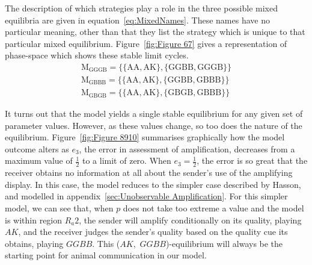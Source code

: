 \documentclass[a4paper,12pt]{article}
\numberwithin{equation}{section}
\begin{document}
The description of which strategies play a role in the three possible mixed equilibria are given in equation~\ref{eq:MixedNames}. These names have no particular meaning, other than that they list the strategy which is unique to that particular mixed equilibrium. Figure~\ref{fig:Figure 67} gives a representation of phase-space which shows these stable limit cycles.
\begin{subequations}
\label{eq:MixedNames}
\begin{gather}
\text{M}_{\text{GGGB}}= \{\{ \text{AA}, \text{AK}\}, \{\text{GGBB}, \text{GGGB}\}\}\\
\text{M}_{\text{GBBB}}= \{\{ \text{AA}, \text{AK}\}, \{\text{GGBB}, \text{GBBB}\}\}\\
\text{M}_{\text{GBGB}}= \{\{ \text{AA}, \text{AK}\}, \{\text{GBGB}, \text{GBBB}\}\}
\end{gather}
\end{subequations}

It turns out that the model yields a single stable equilibrium for any given set of parameter values. However, as these values change, so too does the nature of the equilibrium. Figure~\ref{fig:Figure 8910} summarises graphically how the model outcome alters as $e_{3}$, the error in assessment of amplification, decreases from a maximum value of $\frac{1}{2}$ to a limit of zero. When $e_{3}=\frac{1}{2}$, the error is so great that the receiver obtains no information at all about the sender's use of the amplifying display. In this case, the model reduces to the simpler case described by Hasson, and modelled in appendix~\ref{sec:Unobservable Amplification}. For this simpler model, we can see that, when $p$ does not take too extreme a value and the model is within region $R_{a}2$, the sender will amplify conditionally on its quality, playing $AK$, and the receiver judges the sender's quality based on the quality cue its obtains, playing $GGBB$. This ($AK$,~$GGBB$)-equilibrium will always be the starting point for animal communication in our model.
\end{document}
